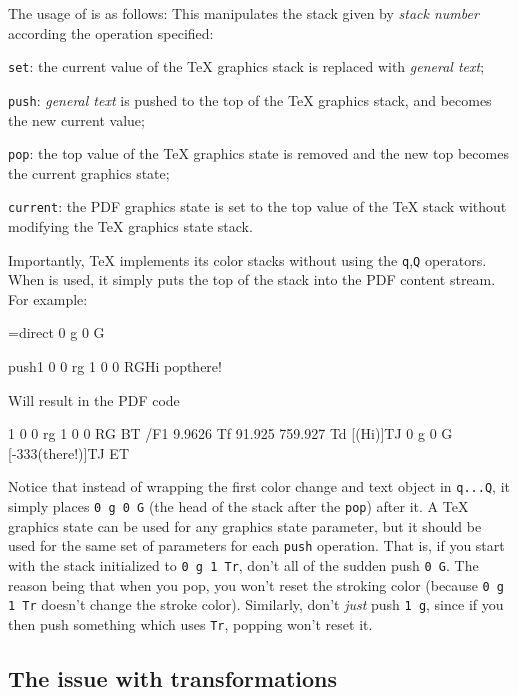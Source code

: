 The usage of \macro\pdfcolorstack{} is as follows:
\noindent This manipulates the stack given by {\it stack number} according the operation specified:
\blist
    \item {\tt set}: the current value of the \TeX{} graphics stack is replaced with {\it general text};
    \item {\tt push}: {\it general text} is pushed to the top of the \TeX{} graphics stack, and becomes the new
    current value;
    \item {\tt pop}: the top value of the \TeX{} graphics state is removed and the new top becomes the
    current graphics state;
    \item {\tt current}: the PDF graphics state is set to the top value of the \TeX{} stack without modifying
    the \TeX{} graphics state stack.
\elist

Importantly, \TeX{} implements its color stacks without using the {\tt q},{\tt Q} operators.
When \macro\pdfcolorstack{} is used, it simply puts the top of the stack into the PDF content stream.
For example:

\blisting
\chardef\tgs=\pdfcolorstackinit direct {0 g 0 G}

\pdfcolorstack\tgs push{1 0 0 rg 1 0 0 RG}Hi
\pdfcolorstack\tgs pop{}there!
\elisting

\noindent Will result in the PDF code

\blisting {}
1 0 0 rg 1 0 0 RG
BT
/F1 9.9626 Tf 91.925 759.927 Td [(Hi)]TJ
0 g 0 G
 [-333(there!)]TJ
ET
\elisting

\noindent Notice that instead of wrapping the first color change and text object in {\tt q...Q}, it simply
places {\tt0 g 0 G} (the head of the stack after the {\tt pop}) after it.
A \TeX{} graphics state can be used for any graphics state parameter, but it should be used for the same set
of parameters for each {\tt push} operation.
That is, if you start with the stack initialized to {\tt0 g 1 Tr}, don't all of the sudden push {\tt0 G}.
The reason being that when you pop, you won't reset the stroking color (because {\tt0 g 1 Tr} doesn't change
the stroke color).
Similarly, don't {\it just} push {\tt1 g}, since if you then push something which uses {\tt Tr}, popping won't
reset it.

\subsection{The issue with transformations}

